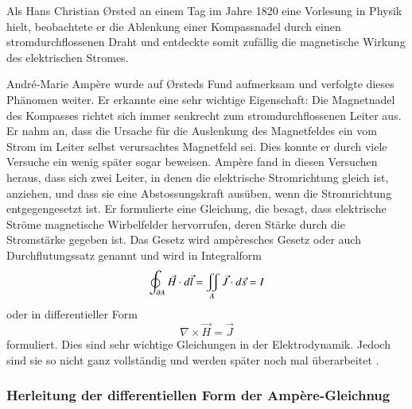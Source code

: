 Als Hans Christian Ørsted an einem Tag im Jahre 1820 eine Vorlesung in Physik hielt, beobachtete er die Ablenkung einer Kompassnadel durch einen stromdurchflossenen Draht und entdeckte somit zufällig die magnetische Wirkung des elektrischen Stromes.
%
%

André-Marie Ampère wurde auf Ørsteds Fund aufmerksam und verfolgte dieses Phänomen weiter.
%
Er erkannte eine sehr wichtige Eigenschaft: Die Magnetnadel des Kompasses richtet sich immer senkrecht zum stromdurchflossenen Leiter aus.
Er nahm an, dass die Ursache für die Auslenkung des Magnetfeldes ein vom Strom im Leiter selbst verursachtes Magnetfeld sei.
Dies konnte er durch viele Versuche ein wenig später sogar beweisen.
Ampère fand in diesen Versuchen heraus, dass sich zwei Leiter, in denen die elektrische Stromrichtung gleich ist, anziehen, und dass sie eine Abstossungskraft ausüben, wenn die Stromrichtung entgegengesetzt ist.
Er formulierte eine Gleichung, die besagt, dass elektrische Ströme magnetische Wirbelfelder hervorrufen, deren Stärke durch die Stromstärke gegeben ist.
Das Gesetz wird ampèresches Gesetz oder auch Durchflutungssatz genannt und wird in Integralform
%
%
%
\begin{equation}
\label{maxwell:equasion:ampere}
\oint_{\d A}
\vec{H}
\cdot
d\vec{l}
=
\iint_{A}
\vec{J}
\cdot
d\vec{s}
=
I
\end{equation}
oder in differentieller Form
%
\[
\nabla
\times
\vec{H}
=
\vec{J}
\]
formuliert.
Dies sind sehr wichtige Gleichungen in der Elektrodynamik.
Jedoch sind sie so nicht ganz vollständig und werden später noch mal überarbeitet
\cite{maxwell:Hans_Christian_Ørsted,maxwell:André-Marie_Ampère}.

\subsubsection{Herleitung der differentiellen Form der Ampère-Gleichnug}

